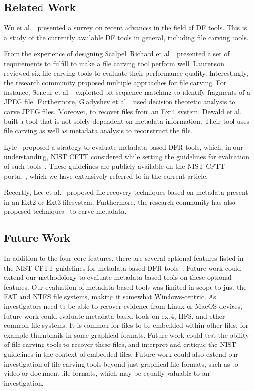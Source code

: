 \subsection{Related Work}

Wu et al.~\cite{wu2020digital} presented a survey on recent advances in the field of DF tools. 
This is a study of the currently available DF tools in general, including file carving tools.

From the experience of designing Scalpel, Richard et al.~\cite{richard2005scalpel} presented 
a set of requirements to fulfill to make a file carving tool perform well. 
Laurenson~\cite{laurenson2013performance} reviewed six file carving tools to evaluate their performance quality.
Interestingly, the research community proposed multiple approaches for file carving. 
For instance, Sencur et al.~\cite{sencar2009identification} exploited bit sequence 
matching to identify fragments of a JPEG file. Furthermore, Gladyshev 
et al.~\cite{gladyshev2017decision} used decision theoretic analysis to carve JPEG files.
Moreover, to recover files from an Ext4 system, Dewald et al.~\cite{dewald2017afeic} built a tool 
that is not solely dependent on metadata information. Their tool uses 
file carving as well as metadata analysis to reconstruct the file.

Lyle~\cite{lyle2011-ICDF2C} proposed a strategy to evaluate metadata-based DFR tools, 
which, in our understanding, NIST CFTT considered while setting the guidelines 
for evaluation of such tools~\cite{meta:dfr:standards}. These guidelines are 
publicly available on the NIST CFTT portal~\cite{cftt:nist}, which we have 
extensively referred to in the current article.

Recently, Lee et al.~\cite{lee2014improved,lee2019extsfr} proposed file recovery techniques based on 
metadata present in an Ext2 or Ext3 filesystem. Furthermore, the research community has also 
proposed techniques~\cite{nordvik2020generic,atwal2019shining} to carve metadata.


\subsection{Future Work}

In addition to the four core features, there are several optional features listed in the NIST CFTT guidelines for metadata-based DFR tools~\cite{meta:dfr:standards}.
Future work could extend our methodology to evaluate metadata-based tools on these optional features.
Our evaluation of metadata-based tools was limited in scope to just the FAT and NTFS file systems, making it somewhat Windows-centric.
As investigators need to be able to recover evidence from Linux or MacOS devices, future work could evaluate metadata-based tools on ext4, HFS, and other common file systems.
It is common for files to be embedded within other files, for example thumbnails in some graphical formats.
Future work could test the ability of file carving tools to recover these files, and interpret and critique the NIST guidelines in the context of embedded files.
Future work could also extend our investigation of file carving tools beyond just graphical file formats, such as to video or document file formats, which may be equally valuable to an investigation.
